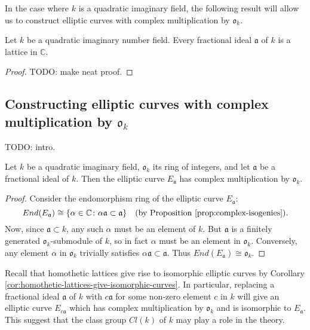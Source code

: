 In the case where $k$ is a quadratic imaginary field, the following result will allow
us to construct elliptic curves with complex multiplication by $\mathfrak{o}_{k}$.

\begin{lem}
  \label{lem:frac-ideals-are-lattices}
  Let $k$ be a quadratic imaginary number field.  Every fractional ideal
  $\mathfrak{a}$ of $k$ is a lattice in $\mathbb{C}$.
\end{lem}

\begin{proof}
  TODO: make neat proof.
\end{proof}

\subsection{Constructing elliptic curves with complex multiplication by
  $\mathfrak{o}_{k}$}
\label{sec:constr-ellipt-curv-with-cm-by-o}

TODO: intro.

\begin{thm}
  \label{thm:cm-curves-from-frac-ideals}
  Let $k$ be a quadratic imaginary field, $\mathfrak{o}_{k}$ its ring of integers,
  and let $\mathfrak{a}$ be a fractional ideal of $k$.  Then the elliptic curve
  $E_{\mathfrak{a}}$ has complex multiplication by $\mathfrak{o}_{k}$.
\end{thm}
\begin{proof}
  Consider the endomorphism ring of the elliptic curve $E_{\mathfrak{a}}$:
  \begin{equation*}
    End(E_{\mathfrak{a}}) \cong \{ \alpha \in \mathbb{C} \colon \alpha\mathfrak{a}
    \subset \mathfrak{a}\} \quad \text{(by Proposition \ref{prop:complex-isogenies})}.
  \end{equation*}
  Now, since $\mathfrak{a} \subset k$, any such $\alpha$ must be an element of $k$.
  But $\mathfrak{a}$ is a finitely generated $\mathfrak{o}_{k}$-submodule of $k$, so
  in fact $\alpha$ must be an element in $\mathfrak{o}_{k}$.  Conversely, any element
  $\alpha$ in $\mathfrak{o}_{k}$ trivially satisfies $\alpha\mathfrak{a} \subset
  \mathfrak{a}$.  Thus $End(E_{\mathfrak{a}}) \cong \mathfrak{o}_{k}$.
\end{proof}
Recall that homothetic lattices give rise to isomorphic elliptic curves by Corollary
\ref{cor:homothetic-lattices-give-isomorphic-curves}.  In particular, replacing a
fractional ideal $\mathfrak{a}$ of $k$ with $c\mathfrak{a}$ for some non-zero element
$c$ in $k$ will give an elliptic curve $E_{c\mathfrak{a}}$ which has complex
multiplication by $\mathfrak{o}_{k}$ and is isomorphic to $E_{\mathfrak{a}}$.  This
suggest that the class group $Cl(k)$ of $k$ may play a role in the theory.

